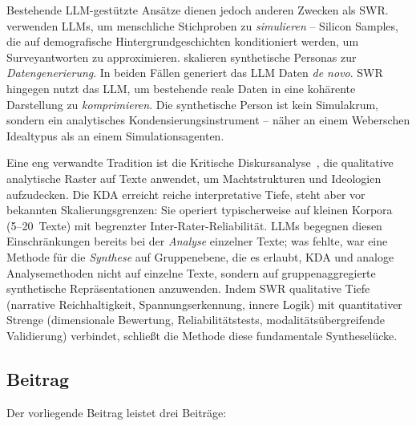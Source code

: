 \documentclass[11pt,a4paper]{article}
\begin{document}
Bestehende LLM-gestützte Ansätze dienen jedoch anderen Zwecken als SWR. \citet{Argyle2023} verwenden LLMs, um menschliche Stichproben zu \emph{simulieren} -- \glqq{}Silicon Samples\grqq{}, die auf demografische Hintergrundgeschichten konditioniert werden, um Surveyantworten zu approximieren. \citet{Ge2024} skalieren synthetische Personas zur \emph{Datengenerierung}. In beiden Fällen generiert das LLM Daten \emph{de novo}. SWR hingegen nutzt das LLM, um bestehende reale Daten in eine kohärente Darstellung zu \emph{komprimieren}. Die synthetische Person ist kein Simulakrum, sondern ein analytisches Kondensierungsinstrument -- näher an einem Weberschen Idealtypus als an einem Simulationsagenten.

Eine eng verwandte Tradition ist die Kritische Diskursanalyse~\citep[KDA;][]{Fairclough1992, Wodak2001}, die qualitative analytische Raster auf Texte anwendet, um Machtstrukturen und Ideologien aufzudecken. Die KDA erreicht reiche interpretative Tiefe, steht aber vor bekannten Skalierungsgrenzen: Sie operiert typischerweise auf kleinen Korpora (5--20~Texte) mit begrenzter Inter-Rater-Reliabilität. LLMs begegnen diesen Einschränkungen bereits bei der \emph{Analyse} einzelner Texte; was fehlte, war eine Methode für die \emph{Synthese} auf Gruppenebene, die es erlaubt, KDA und analoge Analysemethoden nicht auf einzelne Texte, sondern auf gruppenaggregierte synthetische Repräsentationen anzuwenden. Indem SWR qualitative Tiefe (narrative Reichhaltigkeit, Spannungserkennung, innere Logik) mit quantitativer Strenge (dimensionale Bewertung, Reliabilitätstests, modalitätsübergreifende Validierung) verbindet, schließt die Methode diese fundamentale Syntheselücke.


\subsection{Beitrag}
\label{sec:intro:contribution}

Der vorliegende Beitrag leistet drei Beiträge:
\end{document}
